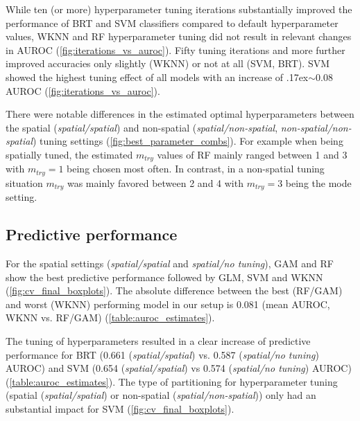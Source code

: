 \documentclass[review]{elsarticle}
\newcommand{\mytilde}{\raise.17ex\hbox{$\scriptstyle\mathtt{\sim}$}}
\begin{document}
While ten (or more) hyperparameter tuning iterations substantially improved the performance of \ac{BRT} and \ac{SVM} classifiers compared to default hyperparameter values, \ac{WKNN} and \ac{RF} hyperparameter tuning did not result in relevant changes in AUROC (\autoref{fig:iterations_vs_auroc}).
Fifty tuning iterations and more further improved accuracies only slightly (\ac{WKNN}) or not at all (\ac{SVM}, \ac{BRT}).
\ac{SVM} showed the highest tuning effect of all models with an increase of \mytilde 0.08 AUROC (\autoref{fig:iterations_vs_auroc}).

There were notable differences in the estimated optimal hyperparameters between the spatial (\emph{spatial/spatial}) and non-spatial (\emph{spatial/non-spatial}, \emph{non-spatial/non-spatial}) tuning settings (\autoref{fig:best_parameter_combs}).
For example when being spatially tuned, the estimated \texttt{$m_{try}$} values of RF mainly ranged between 1 and 3 with \texttt{$m_{try} = 1$} being chosen most often.
In contrast, in a non-spatial tuning situation \texttt{$m_{try}$} was mainly favored between 2 and 4 with \texttt{$m_{try} = 3$} being the mode setting.

\subsection{Predictive performance}
\label{subsec:pred_perf}

For the spatial settings (\emph{spatial/spatial} and \emph{spatial/no tuning}), GAM and \ac{RF} show the best predictive performance followed by GLM, SVM and WKNN (\autoref{fig:cv_final_boxplots}).
The absolute difference between the best (RF/GAM) and worst (WKNN) performing model in our setup is 0.081 (mean AUROC, WKNN vs. \ac{RF}/GAM) (\autoref{table:auroc_estimates}).

The tuning of hyperparameters resulted in a clear increase of predictive performance for BRT (0.661 (\emph{spatial/spatial}) vs. 0.587 (\emph{spatial/no tuning}) AUROC) and SVM (0.654 (\emph{spatial/spatial}) vs 0.574 (\emph{spatial/no tuning}) AUROC) (\autoref{table:auroc_estimates}).
The type of partitioning for hyperparameter tuning (spatial (\emph{spatial/spatial}) or non-spatial (\emph{spatial/non-spatial})) only had an substantial impact for SVM (\autoref{fig:cv_final_boxplots}).
\end{document}
